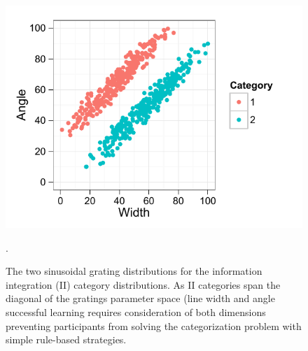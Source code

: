 \documentclass[doc,12pt]{apa}        %
\begin{document}
\begin{figure}[tp]
	\includegraphics{f_II}
    \centering
    \caption{The two sinusoidal grating distributions for the information integration (II) category distributions.  As II categories span the diagonal of the gratings parameter space (line width and angle successful learning requires consideration of both dimensions preventing participants from solving the categorization problem with simple rule-based strategies.}.
	\label{fig:II}
\end{figure}
\end{document}
